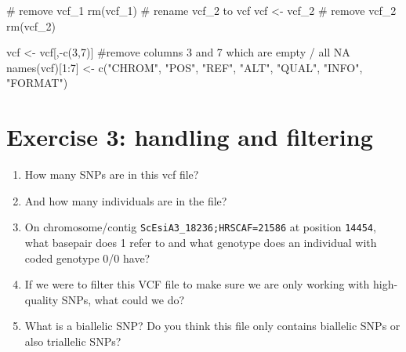\documentclass[
  letterpaper,
  DIV=11,
  numbers=noendperiod]{scrreprt}
\newenvironment{Shaded}{}{}
\newcommand{\CommentTok}[1]{\textcolor[rgb]{0.42,0.45,0.49}{#1}}
\newcommand{\DecValTok}[1]{\textcolor[rgb]{0.00,0.36,0.77}{#1}}
\newcommand{\FunctionTok}[1]{\textcolor[rgb]{0.44,0.26,0.76}{#1}}
\newcommand{\NormalTok}[1]{\textcolor[rgb]{0.14,0.16,0.18}{#1}}
\newcommand{\OtherTok}[1]{\textcolor[rgb]{0.44,0.26,0.76}{#1}}
\newcommand{\SpecialCharTok}[1]{\textcolor[rgb]{0.00,0.36,0.77}{#1}}
\newcommand{\StringTok}[1]{\textcolor[rgb]{0.01,0.18,0.38}{#1}}
\providecommand{\tightlist}{%
  \setlength{\itemsep}{0pt}\setlength{\parskip}{0pt}}\usepackage{longtable,booktabs,array}
\begin{document}
\begin{tcolorbox}[enhanced jigsaw, arc=.35mm, left=2mm, titlerule=0mm, rightrule=.15mm, colframe=quarto-callout-tip-color-frame, coltitle=black, colback=white, opacityback=0, bottomtitle=1mm, bottomrule=.15mm, colbacktitle=quarto-callout-tip-color!10!white, breakable, title=\textcolor{quarto-callout-tip-color}{\faLightbulb}\hspace{0.5em}{Code and answer}, toptitle=1mm, toprule=.15mm, opacitybacktitle=0.6, leftrule=.75mm]

\begin{Shaded}
\begin{Highlighting}[]
\CommentTok{\# remove vcf\_1}
\FunctionTok{rm}\NormalTok{(vcf\_1)}
\CommentTok{\# rename vcf\_2 to vcf}
\NormalTok{vcf }\OtherTok{\textless{}{-}}\NormalTok{ vcf\_2}
\CommentTok{\# remove vcf\_2}
\FunctionTok{rm}\NormalTok{(vcf\_2)}

\NormalTok{vcf }\OtherTok{\textless{}{-}}\NormalTok{ vcf[,}\SpecialCharTok{{-}}\FunctionTok{c}\NormalTok{(}\DecValTok{3}\NormalTok{,}\DecValTok{7}\NormalTok{)] }\CommentTok{\#remove columns 3 and 7 which are empty / all NA}
\FunctionTok{names}\NormalTok{(vcf)[}\DecValTok{1}\SpecialCharTok{:}\DecValTok{7}\NormalTok{] }\OtherTok{\textless{}{-}} \FunctionTok{c}\NormalTok{(}\StringTok{"CHROM"}\NormalTok{, }\StringTok{"POS"}\NormalTok{, }\StringTok{"REF"}\NormalTok{, }\StringTok{"ALT"}\NormalTok{, }\StringTok{"QUAL"}\NormalTok{, }\StringTok{"INFO"}\NormalTok{, }\StringTok{"FORMAT"}\NormalTok{)}
\end{Highlighting}
\end{Shaded}

\end{tcolorbox}

\section{Exercise 3: handling and
filtering}\label{exercise-3-handling-and-filtering}

\begin{enumerate}
\def\labelenumi{\arabic{enumi}.}
\tightlist
\item
  How many SNPs are in this vcf file?
\item
  And how many individuals are in the file?
\item
  On chromosome/contig \texttt{ScEsiA3\_18236;HRSCAF=21586} at position
  \texttt{14454}, what basepair does 1 refer to and what genotype does
  an individual with coded genotype 0/0 have?
\item
  If we were to filter this VCF file to make sure we are only working
  with high-quality SNPs, what could we do?
\item
  What is a biallelic SNP? Do you think this file only contains
  biallelic SNPs or also triallelic SNPs?
\end{enumerate}
\end{document}
